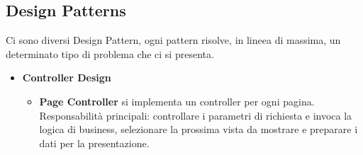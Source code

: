 \subsection{Design Patterns}
Ci sono diversi Design Pattern, ogni pattern risolve, in lineea di massima, un determinato tipo di problema che ci si presenta.
\begin{itemize}
    \item \textbf{Controller Design}
    \begin{itemize}
        \item \textbf{Page Controller} si implementa un controller per ogni pagina.\\
         Responsabilità principali: controllare i parametri di richiesta e invoca la logica di business, selezionare la prossima vista da mostrare e preparare i dati per la presentazione.\\


\end{itemize}
\end{itemize}
